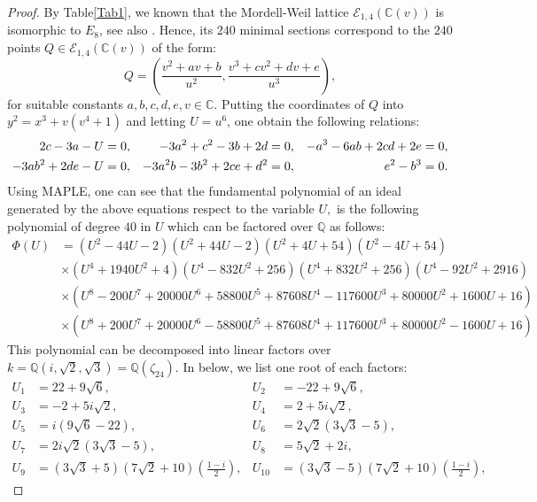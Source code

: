 \documentclass[11pt]{amsart}
\newcommand{\Q}{{\mathbb Q}}
\newcommand{\CC}{{\mathbb C}}
\newcommand{\Ee}{{\mathcal E}}
\numberwithin{equation}{section}
\numberwithin{table}{section}
\newcommand\<{\langle}
\begin{document}
\begin{proof}
	By Table\ref{Tab1}, we   known that the Mordell-Weil lattice   $\Ee_{1, 4}(\CC(v))$ is isomorphic to $E_8$,  see also \cite{Shioda1991d}. Hence, its   $240$ minimal sections
	correspond to the  $240$ points  $Q\in \Ee_{1, 4}(\CC(v))$ of the form:
	\begin{equation}
		\label{eq1-4}
		Q=\left(\frac{v^2 +a v +b}{u^2}, \frac{v^3 + c v^2 + d v + e}{u^3} \right),
	\end{equation}
	for suitable constants $a, b, c, d, e, v \in \CC.$ 
	Putting the coordinates of $Q$ into   $ y^2=x^3 + v ( v^4+1)$  and letting $U=u^6$, one  obtain  the following relations:
	\begin{align}
		2c -3a -U & =0, & 
		-3a^2+c^2-3 b+2 d & =0, &
		-a^3-6 a b+2cd+2e & =0, \notag \\ \label{rel3b}
		-3 a b^2+2 d e-U & =0, &
		-3 a^2 b-3 b^2+2 c e+d^2 & =0,& 
		e^2 - b^3 & = 0.
	\end{align}
Using MAPLE, one can see that 	the fundamental polynomial of an ideal generated by the above equations  respect to the variable $U,$   is the following  polynomial of degree $40$ in $U$ which can be factored over $\Q$ as follows:
	\begin{align*}
		\Phi(U)& =(U^2-44 U-2)(U^2+44 U-2) (U^2+4 U+54) (U^2-4 U+54)  \\
		& \times (U^4+1940 U^2+4) (U^4-832 U^2+256) (U^4+832 U^2+256) (U^4-92 U^2+2916) \\
		& \times(U^8-200 U^7+20000 U^6+58800 U^5+87608 U^4-117600 U^3+80000 U^2+1600 U+16)\\
		& \times (U^8+200 U^7+20000 U^6-58800 U^5+87608 U^4+117600 U^3+80000 U^2-1600 U+16)
	\end{align*}	
	This polynomial can be decomposed into linear factors over 
	$k=\Q (i, \sqrt{2}, \sqrt{3})=\Q(\zeta_{24})$. In below, we list one root of each factors:
	\begin{align*}
		U_1 & =22 + 9 \sqrt{6}, & U_2& = -22 + 9 \sqrt{6}, \\ U_3& =-2 +5 i \sqrt{2}, &	U_4 & =2+ 5 i \sqrt{2},  \\ U_5 &= i (9 \sqrt{6}-22), &	U_6 &= 2 \sqrt{2} (3 \sqrt{3}-5), \\ 
		 U_7 &= 2 i \sqrt{2} (3 \sqrt{3}-5), &
		U_8&=	  5 \sqrt{2} +2 i,\\
		U_9 & = (3 \sqrt{3}+5) (7 \sqrt{2}+10) \left(\frac{1-i}{2} \right), &
		U_{10} &=  (3 \sqrt{3}-5) (7 \sqrt{2}+10) \left(\frac{1-i}{2} \right),
	\end{align*}  

\end{proof}
\end{document}
